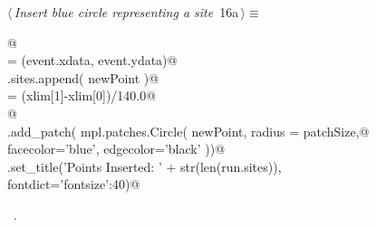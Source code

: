 \documentclass[11.5pt]{report}
\begin{document}
\vspace{-0.8cm} \newchunk
\begin{flushleft} \small
\begin{minipage}{\linewidth}\label{scrap8}\raggedright\small
{} $\langle\,${\itshape Insert blue circle representing a site}\nobreak\ {\footnotesize {16a}}$\,\rangle\equiv$
\vspace{-1ex}
\begin{list}{}{} \item
\mbox{}\verb@  @\\
\mbox{}\verb@newPoint = (event.xdata, event.ydata)@\\
\mbox{}\verb@run.sites.append( newPoint  )@\\
\mbox{}\verb@patchSize  = (xlim[1]-xlim[0])/140.0@\\
\mbox{}\verb@   @\\
\mbox{}\verb@ax.add_patch( mpl.patches.Circle( newPoint, radius = patchSize,@\\
\mbox{}\verb@                                  facecolor='blue', edgecolor='black'  ))@\\
\mbox{}\verb@ax.set_title('Points Inserted: ' + str(len(run.sites)), \@\\
\mbox{}\verb@             fontdict={'fontsize':40})@\\
\mbox{}\verb@@{\NWsep}
\end{list}
\vspace{-1.5ex}
\footnotesize
\begin{list}{}{\setlength{\itemsep}{-\parsep}\setlength{\itemindent}{-\leftmargin}}
\item \NWtxtMacroRefIn\ .

\item{}
\end{list}
\end{minipage}\vspace{4ex}
\end{flushleft}
\end{document}
